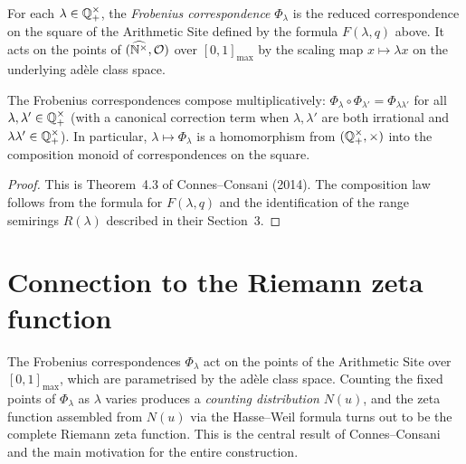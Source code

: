 \begin{definition}[label=def:frobenius_correspondence,
                  uses=def:arithmetic_site, def:scaling_action]
  \label{def:frobenius_correspondence}
  For each $\lambda \in \mathbb{Q}^{\times}_{+}$, the \emph{Frobenius correspondence}
  $\Phi_\lambda$ is the reduced correspondence on the square of the
  Arithmetic Site defined by the formula $F(\lambda, q)$ above.  It
  acts on the points of $(\widehat{\mathbb{N}^{\times}}, \mathcal{O})$ over $[0,1]_{\max}$
  by the scaling map $x \mapsto \lambda x$ on the underlying ad\`ele
  class space.
\end{definition}

\begin{theorem}[label=thm:frobenius_are_correspondences,
               uses=def:frobenius_correspondence,
               thm:points_are_adele_classes]
  \label{thm:frobenius_are_correspondences}
  The Frobenius correspondences compose multiplicatively:
  $\Phi_\lambda \circ \Phi_{\lambda'} = \Phi_{\lambda\lambda'}$ for all
  $\lambda, \lambda' \in \mathbb{Q}^{\times}_{+}$ (with a canonical correction term when
  $\lambda, \lambda'$ are both irrational and $\lambda\lambda' \in
  \mathbb{Q}^{\times}_{+}$).  In particular, $\lambda \mapsto \Phi_\lambda$ is a
  homomorphism from $(\mathbb{Q}^{\times}_{+}, \times)$ into the composition monoid of
  correspondences on the square.
\end{theorem}
\begin{proof}
  This is Theorem~4.3 of Connes--Consani (2014).  The composition law
  follows from the formula for $F(\lambda, q)$ and the identification of
  the range semirings $R(\lambda)$ described in their Section~3.
  \sorry
\end{proof}

\chapter{Connection to the Riemann zeta function}

The Frobenius correspondences $\Phi_\lambda$ act on the points of the
Arithmetic Site over $[0,1]_{\max}$, which are parametrised by the
ad\`ele class space.  Counting the fixed points of $\Phi_\lambda$ as
$\lambda$ varies produces a \emph{counting distribution} $N(u)$, and
the zeta function assembled from $N(u)$ via the Hasse--Weil formula
turns out to be the complete Riemann zeta function.  This is the
central result of Connes--Consani and the main motivation for the
entire construction.

